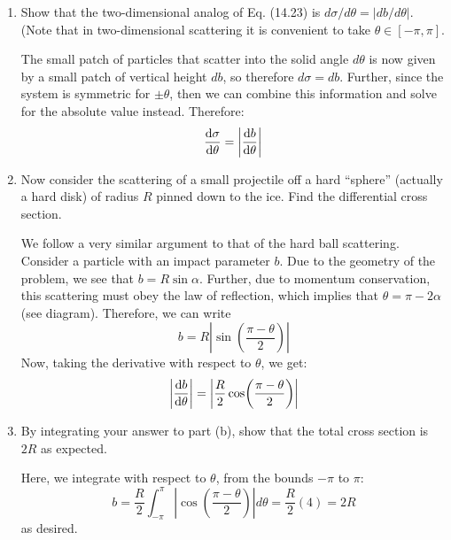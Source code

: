 \documentclass[10pt]{article}
\begin{document}
	\begin{enumerate}[label=\alph*)]
		\item Show that the two-dimensional analog of Eq. (14.23) is $d\sigma/d\theta = |db/d\theta|$. (Note
			that in two-dimensional scattering it is convenient to take $\theta \in [-\pi, \pi]$. 

			\begin{solution}
				The small patch of particles that scatter into the solid angle $d\theta$ is now 
				given by a small patch of vertical height $db$, so therefore $d\sigma = db$. 
				Further, since the system is symmetric for $\pm \theta$, then we can combine this 
				information and solve for the absolute value instead. Therefore:
				\[
					\dv{\sigma}{\theta} = \left| \dv{b}{\theta}\right|
				\] 
			\end{solution}
		\item Now consider the scattering of a small projectile off a hard ``sphere'' (actually a hard
			disk) of radius $R$ pinned down to the ice. Find the differential cross section.

			\begin{solution}
				We follow a very similar argument to that of the hard ball scattering. Consider a particle
				with an impact parameter $b$. Due to the geometry of the problem, we see that 
				$b = R \sin \alpha$. Further, due to momentum conservation, this scattering must obey the law
				of reflection, which implies that $\theta = \pi - 2\alpha$ (see diagram). Therefore, 
				we can write
				\[
				b = R \left|\sin (\frac{\pi - \theta}{2})\right|
				\] 
				Now, taking the derivative with respect to $\theta$, we get: 
				\[
					\left|\dv{b}{\theta}\right| = \left|\frac{R}{2}\cos(\frac{\pi - \theta}{2})\right|
				\] 
			\end{solution}
		\item By integrating your answer to part (b), show that the total cross section is $2R$ as expected.

			\begin{solution}
				Here, we integrate with respect to $\theta$, from the bounds $-\pi$ to $\pi$:
				\[
					b = \frac{R}{2}\int_{-\pi}^\pi \left| \cos\left( \frac{\pi - \theta}{2} \right) \right| d\theta = \frac{R}{2}(4) = 2R
				\] 
				as desired. 
			\end{solution}
	\end{enumerate}

	\pagebreak
\end{document}
